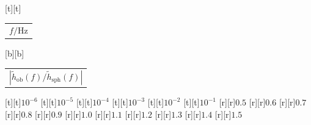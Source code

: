 %    
%
%
\begin{psfrags}%
\psfragscanon%
%
[t][t]{\color[rgb]{0,0,0}\setlength{\tabcolsep}{0pt}\begin{tabular}{c}{\Large$f/\mathrm{Hz}$}\end{tabular}}%
[b][b]{\color[rgb]{0,0,0}\setlength{\tabcolsep}{0pt}\begin{tabular}{c}{\Large$\left|\widetilde{h}_\mathrm{ob}(f)/\widetilde{h}_\mathrm{sph}(f)\right|$}\end{tabular}}%
%
[t][t]{$10^{-6}$}%
[t][t]{$10^{-5}$}%
[t][t]{$10^{-4}$}%
[t][t]{$10^{-3}$}%
[t][t]{$10^{-2}$}%
[t][t]{$10^{-1}$}%
%
[r][r]{$0.5$}%
[r][r]{$0.6$}%
[r][r]{$0.7$}%
[r][r]{$0.8$}%
[r][r]{$0.9$}%
[r][r]{$1.0$}%
[r][r]{$1.1$}%
[r][r]{$1.2$}%
[r][r]{$1.3$}%
[r][r]{$1.4$}%
[r][r]{$1.5$}%
%
%
\end{psfrags}%
%
